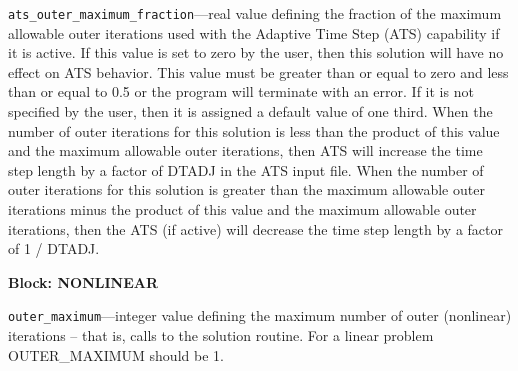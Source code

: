 \begin{description}
\item \texttt{ats\_outer\_maximum\_fraction}---real value defining the fraction of the maximum allowable outer iterations used with the Adaptive Time Step (ATS) capability if it is active.  If this value is set to zero by the user, then this solution will have no effect on ATS behavior.  This value must be greater than or equal to zero and less than or equal to 0.5 or the program will terminate with an error.  If it is not specified by the user, then it is assigned a default value of one third.  When the number of outer iterations for this solution is less than the product of this value and the maximum allowable outer iterations, then ATS will increase the time step length by a factor of DTADJ in the ATS input file.  When the number of outer iterations for this solution is greater than the maximum allowable outer iterations minus the product of this value and the maximum allowable outer iterations, then the ATS (if active) will decrease the time step length by a factor of 1 / DTADJ.

\end{description}
\item \textbf{Block: NONLINEAR}

\begin{description}
\item \texttt{outer\_maximum}---integer value defining the maximum number of outer (nonlinear) iterations -- that is, calls to the solution routine. For a linear problem OUTER\_MAXIMUM should be 1.

\end{description}

